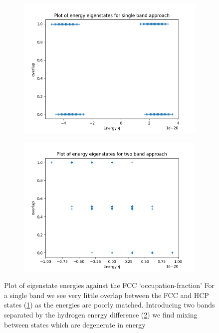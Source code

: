 \begin{figure}[htbp]
    \centering
    \begin{subfigure}{0.45\linewidth}
        \includegraphics[width=0.9\linewidth]{Figures/Simulation/single band eigenstate energies.png}
        \label{fig:one band overlap}
    \end{subfigure}
    \begin{subfigure}{0.45\linewidth}
        \includegraphics[width=0.9\linewidth]{Figures/Simulation/two band eigenstate energies.png}
        \label{fig:two band overlap}
    \end{subfigure}
    \caption{Plot of eigenstate energies
        against the FCC `occupation-fraction'
        For a single band we
        see very little overlap between the FCC and HCP
        states (\cref{fig:one band overlap})
        as the energies are poorly matched.
        Introducing two bands separated by the hydrogen energy
        difference (\cref{fig:two band overlap})
        we find mixing between states which are
        degenerate in energy
    }\label{fig:overlap with hydrogen energies}
\end{figure}
